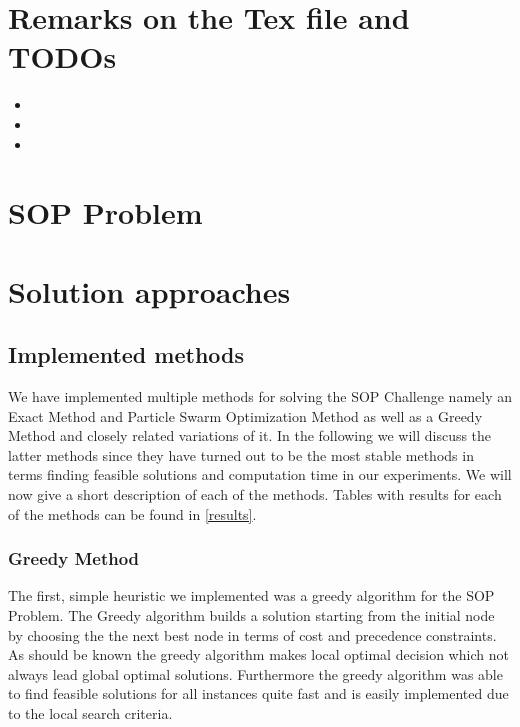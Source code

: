 \documentclass[]{article}
\begin{document}
    \maketitle
    \tableofcontents



    \section{Remarks on the Tex file and TODOs}

    \begin{itemize}
    	\item {}
    	\item {}
  		\item {}
    \end{itemize}

    \section{SOP Problem}

    

    \section{Solution approaches}

    \subsection{Implemented methods}

    We have implemented multiple methods for solving the SOP Challenge namely an Exact Method and Particle Swarm Optimization Method as well as a Greedy Method and closely related variations of it. In the following we will discuss the latter methods since they have turned out to be the most stable methods in terms finding feasible solutions and computation time in our experiments. We will now give a short description of each of the methods. Tables with results for each of the methods can be found in \ref{results}.

    \subsubsection{Greedy Method}

   	The first, simple heuristic we implemented was a greedy algorithm for the SOP Problem. The Greedy algorithm builds a solution starting from the initial node by choosing the the next best node in terms of cost and precedence constraints. As should be known the greedy algorithm makes local optimal decision which not always lead global optimal solutions. Furthermore the greedy algorithm was able to find feasible solutions for all instances quite fast and is easily implemented due to the local search criteria. \cite{Cormen2009} \\
\end{document}
